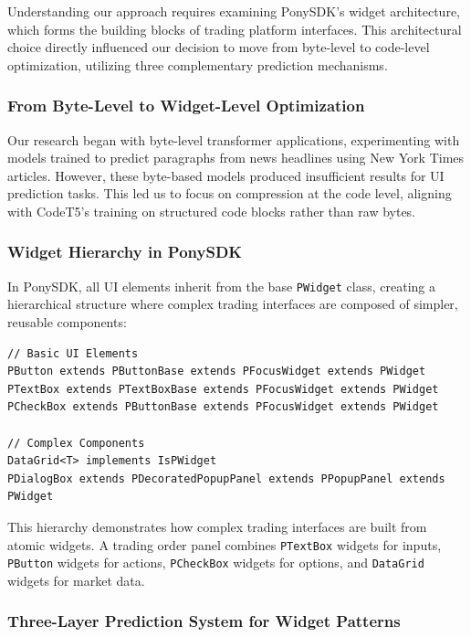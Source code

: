 \documentclass[12pt,a4paper]{article}
\begin{document}
Understanding our approach requires examining PonySDK's widget architecture, which forms the building blocks of trading platform interfaces. This architectural choice directly influenced our decision to move from byte-level to code-level optimization, utilizing three complementary prediction mechanisms.

\subsubsection{From Byte-Level to Widget-Level Optimization}

Our research began with byte-level transformer applications, experimenting with models trained to predict paragraphs from news headlines using New York Times articles. However, these byte-based models produced insufficient results for UI prediction tasks. This led us to focus on compression at the code level, aligning with CodeT5's training on structured code blocks rather than raw bytes.

\subsubsection{Widget Hierarchy in PonySDK}

In PonySDK, all UI elements inherit from the base \texttt{PWidget} class, creating a hierarchical structure where complex trading interfaces are composed of simpler, reusable components:

\begin{lstlisting}[caption=PonySDK Widget Hierarchy Examples]
// Basic UI Elements
PButton extends PButtonBase extends PFocusWidget extends PWidget
PTextBox extends PTextBoxBase extends PFocusWidget extends PWidget  
PCheckBox extends PButtonBase extends PFocusWidget extends PWidget

// Complex Components
DataGrid<T> implements IsPWidget
PDialogBox extends PDecoratedPopupPanel extends PPopupPanel extends PWidget
\end{lstlisting}

This hierarchy demonstrates how complex trading interfaces are built from atomic widgets. A trading order panel combines \texttt{PTextBox} widgets for inputs, \texttt{PButton} widgets for actions, \texttt{PCheckBox} widgets for options, and \texttt{DataGrid} widgets for market data.

\subsubsection{Three-Layer Prediction System for Widget Patterns}
\end{document}
